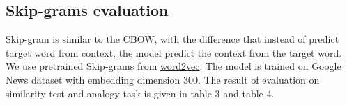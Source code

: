 \documentclass[a4paper, 11pt]{article}
\begin{document}
\subsection{Skip-grams evaluation}
Skip-gram is similar to the CBOW, with the difference that instead of predict target word from context, the model predict the context from the target word. We use pretrained Skip-grams from \href{https://code.google.com/p/word2vec/}{word2vec}. The model is trained on Google News dataset with embedding dimension 300. The result of evaluation on similarity test and analogy task is given in table 3 and table 4.
\begin{table}[ht!]
\centering
{}
\caption{Similarity result of Skip-gram}
\label{tab:my-table}
\end{table}
\begin{table}[ht!]
\centering
{}
\caption{Analogy tasks on Skip-grams }
\label{tab:my-table}
\end{table}
\end{document}

